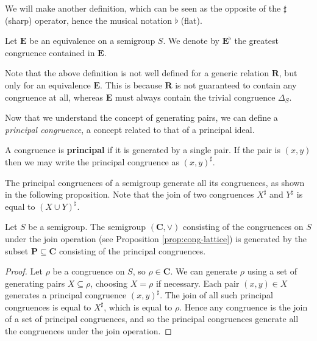 We will make another definition, which can be seen as the opposite of the
$\sharp$ (sharp) operator, hence the musical notation $\flat$ (flat).

\begin{definition}
  \label{def:e-flat}
  Let $\mathbf{E}$ be an equivalence on a semigroup $S$.  We denote by
  $\mathbf{E}^\flat$ the greatest congruence contained in $\mathbf{E}$.
\end{definition}

Note that the above definition is not well defined for a generic relation
$\mathbf{R}$, but only for an equivalence $\mathbf{E}$.  This is because
$\mathbf{R}$ is not guaranteed to contain any congruence at all, whereas
$\mathbf{E}$ must always contain the trivial congruence $\Delta_S$.

Now that we understand the concept of generating pairs, we can define a
\textit{principal congruence}, a concept related to that of a principal ideal.

\begin{definition}
  \label{def:principal-cong}
  A congruence is \textbf{principal} if it is generated by a single pair.  If
  the pair is $(x,y)$ then we may write the principal congruence as
  $(x,y)^\sharp$.
\end{definition}

The principal congruences of a semigroup generate all its congruences, as shown
in the following proposition.  Note that the join of two congruences $X^\sharp$
and $Y^\sharp$ is equal to $(X \cup Y)^\sharp$.

\begin{proposition}
  \label{prop:congruence-lattice-gens}
  Let $S$ be a semigroup.  The semigroup $(\mathbf{C}, \vee)$ consisting of the
  congruences on $S$ under the join operation (see Proposition
  \ref{prop:cong-lattice}) is generated by the subset
  $\mathbf{P} \subseteq \mathbf{C}$ consisting of the principal congruences.
  \begin{proof}
    Let $\rho$ be a congruence on $S$, so $\rho \in \mathbf{C}$.  We can
    generate $\rho$ using a set of generating pairs $X \subseteq \rho$, choosing
    $X = \rho$ if necessary.  Each pair $(x,y) \in X$ generates a principal
    congruence $(x,y)^\sharp$.  The join of all such principal congruences is
    equal to $X^\sharp$, which is equal to $\rho$.  Hence any congruence is the
    join of a set of principal congruences, and so the principal congruences
    generate all the congruences under the join operation.
  \end{proof}
\end{proposition}

